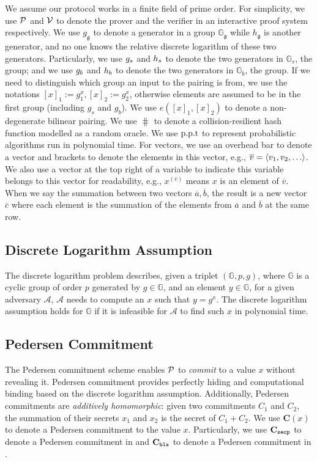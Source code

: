 We assume our protocol works in a finite field of prime order. For simplicity, we use $\mathcal{P}$ and $\mathcal{V}$ to denote the prover and the verifier in an interactive proof system respectively. We use $g_\mathfrak{g}$ to denote a generator in a group $\mathbb{G}_\mathfrak{g}$ while $h_\mathfrak{g}$ is another generator, and no one knows the relative discrete logarithm of these two generators. Particularly, we use $g_s$ and $h_s$ to denote the two generators in $\mathbb{G}_s$, the \secp group; and we use $g_b$ and $h_b$ to denote the two generators in $\mathbb{G}_b$, the \bls group. If we need to distinguish which group an input to the pairing is from, we use the notations $[x]_1:=g_1^x,[x]_2:=g_2^x$, otherwise elements are  assumed to be in the first group (including $g_s$ and $g_b$). We use $e([x]_1,[x]_2)$ to denote a non-degenerate bilinear pairing. We use $\hash$ to denote a collision-resilient hash function modelled as a random oracle. We use $\text{p.p.t}$ to represent probabilistic algorithms run in polynomial time.  For vectors, we use an overhead bar to denote a vector and brackets to denote the elements in this vector, e.g., $\overline{v}=\tuple{v_1,v_2,\dots}$. We also use a vector at the top right of a variable to indicate this variable belongs to this vector for readability, e.g., $x^{(\overline{v})}$ means $x$ is an element of $\overline{v}$. When we say the summation between two vectors $\overline{a},\overline{b}$, the result is a new vector $\overline{c}$ where each element is the summation of the elements from $\overline{a}$ and $\overline{b}$ at the same row.

\subsection{Discrete Logarithm Assumption}
\label{sec:dlp}
The discrete logarithm problem describes, given a triplet $(\mathbb{G}, p, g)$, where $\mathbb{G}$ is a cyclic group of order $p$ generated by $g\in\mathbb{G}$, and an element $y\in\mathbb{G}$, for a given adversary $\mathcal{A}$, $\mathcal{A}$ needs to compute an $x$ such that $y=g^x$. The discrete logarithm assumption holds for $\mathbb{G}$ if it is infeasible for $\mathcal{A}$ to find such $x$ in polynomial time.

\subsection{Pedersen Commitment}
\label{sec:pedersen}
The Pedersen commitment scheme \cite{pedersen} enables $\mathcal{P}$ to \textit{commit} to a value $x$ without revealing it. Pedersen commitment provides perfectly hiding and computational binding based on the discrete logarithm assumption. Additionally, Pedersen commitments are \textit{additively homomorphic}: given two commitments $C_1$ and $C_2$, the summation of their secrets $x_1$ and $x_2$ is the secret of $C_1+C_2$. We use $\textbf{C}(x)$ to denote a Pedersen commitment to the value $x$. Particularly, we use $\textbf{C}_\texttt{secp}$ to denote a Pedersen commitment in \secp and $\textbf{C}_\texttt{bls}$ to denote a Pedersen commitment in \bls.

